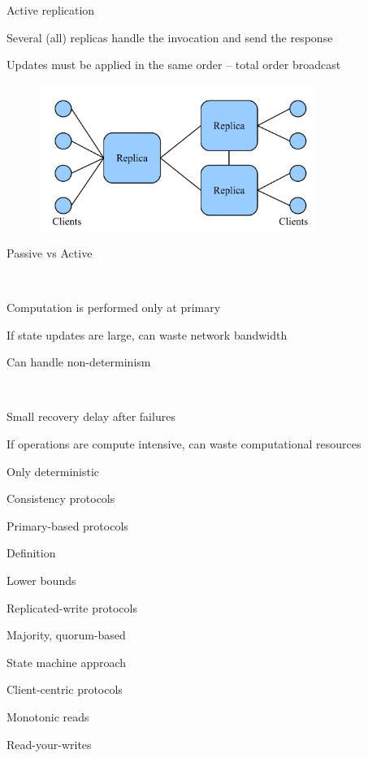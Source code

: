 \begin{frame}{Active replication}
\BI
\item Several (all) replicas handle the invocation and send the response
\item Updates must be applied in the same order – total order broadcast 
\EI
\begin{figure}
	\includegraphics[width=0.8\textwidth]{figs/09/active}
\end{figure}

\end{frame}

\begin{frame}{Passive vs Active}

\\
\BI
\item Computation is performed only at primary
\item If state updates are large, can waste network bandwidth
\item Can handle non-determinism
\EI

\bigskip
{}\\
\BI
\item Small recovery delay after failures
\item If operations are compute intensive, can waste computational resources
\item Only deterministic
\EI

\end{frame}


\begin{frame}{Consistency protocols}

\BIL
\item Primary-based protocols
	\BI
	\item Definition
	\item Lower bounds
	\EI
\item Replicated-write protocols
	\BI
	\item Majority, quorum-based
	\item State machine approach
	\EI
\item Client-centric protocols
\BI
\item Monotonic reads
\item Read-your-writes
\EI
\EIL

\end{frame}

